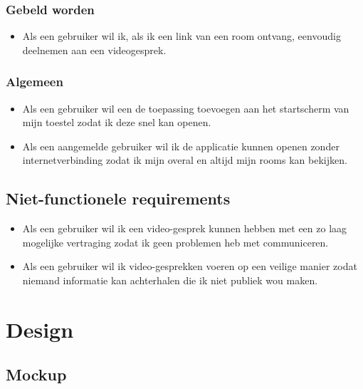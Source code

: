 	 	\subsubsection{Gebeld worden}
	 	 \begin{itemize}
				\item Als een gebruiker wil ik, als ik een link van een room ontvang, eenvoudig deelnemen aan een videogesprek.
	 	 \end{itemize}
	
		\subsubsection{Algemeen}
	 		\begin{itemize}
	 			\item Als een gebruiker wil een de toepassing toevoegen aan het startscherm van mijn toestel zodat ik deze snel kan openen.
	 			\item Als een aangemelde gebruiker wil ik de applicatie kunnen openen zonder internetverbinding zodat ik mijn overal en altijd mijn rooms kan bekijken.
			\end{itemize}
	 
	\subsection{Niet-functionele requirements}
		\begin{itemize}
			\item Als een gebruiker wil ik een video-gesprek kunnen hebben met een zo laag mogelijke vertraging zodat ik geen problemen heb met communiceren.
			\item Als een gebruiker wil ik video-gesprekken voeren op een veilige manier zodat niemand informatie kan achterhalen die ik niet publiek wou maken.
		\end{itemize} 
		


\section{Design}
		\subsection{Mockup}
					
